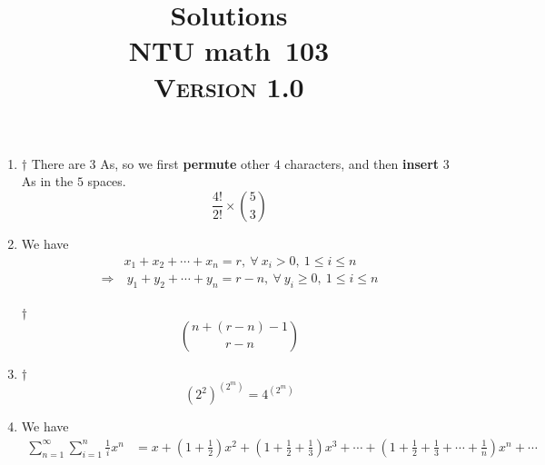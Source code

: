 \documentclass[a4paper,12pt]{article}
\newcommand{\school}{ntu}
\newcommand{\subject}{math}
\renewcommand{\year}{103}
\newcommand{\titlename}{\MakeUppercase{\school} \subject \ \year}
\newcommand{\ver}{\textsc{Version} 1.0} %
\begin{document}
\title{\LARGE{\textbf{Solutions}} \\
	\Huge{\textbf{\titlename}} \\
	\normalsize{\ver}
}
\author{}
\date{}

\maketitle


\begin{enumerate}
	\item \begin{answer}{$\dag$} There are $3$ As, so we first \textbf{permute} other $4$ characters, and then \textbf{insert} $3$ As in the $5$ spaces. \begin{equation}
            \frac{4!}{2!} \times \binom{5}{3}    
        \end{equation}
    \end{answer}
    \item We have \begin{equation}
        \begin{aligned}
            & x_1 + x_2 + \cdots + x_n = r, \ \forall \ x_i > 0, \ 1 \le i \le n \\
            \Rightarrow & \ y_1 + y_2 + \cdots + y_n = r - n, \ \forall \ y_i \ge 0, \ 1 \le i \le n \\
        \end{aligned}
    \end{equation}
    \begin{answer}{$\dag$}\begin{equation}
            \binom{n + (r - n) - 1}{r - n}
        \end{equation}
    \end{answer}
    \item \begin{answer}{$\dag$}\begin{equation}
            (2^2)^{(2^m)} = 4^{(2^m)}
        \end{equation}
    \end{answer}
    \item We have \begin{equation}
        \begin{aligned}
            \sum_{n = 1}^{\infty}\sum_{i = 1}^{n}\frac{1}{i}x^n & = x + (1 + \frac{1}{2})x^2 + (1 + \frac{1}{2} + \frac{1}{3})x^3 + \cdots + (1 + \frac{1}{2} + \frac{1}{3} + \cdots + \frac{1}{n})x^n + \cdots \\

\end{aligned}
\end{equation}
\end{enumerate}
\end{document}
